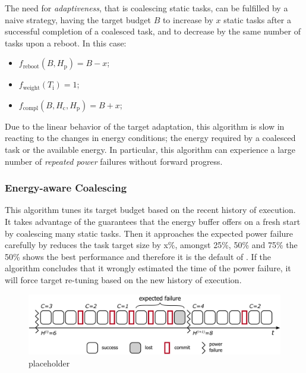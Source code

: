 The need for \emph{adaptiveness}, that is coalescing static tasks, can be fulfilled by a naive strategy, having the target budget $B$ to increase by $x$ static tasks after a successful completion of a coalesced task, and to decrease by the same number of tasks upon a reboot. In this case: 
\begin{itemize}
\item $f_\text{reboot}(B, H_\text{p}) = B - x $;
\item $f_\text{weight}(T_\text{i}) =  1$; 
\item $f_\text{compl}(B,H_\text{c},H_\text{p}) = B + x$; 
\end{itemize}
Due to the linear behavior of the target adaptation, this algorithm is slow in reacting to the changes in energy conditions; the energy required by a coalesced task or the available energy. In particular, this algorithm can experience a large number of \emph{repeated power} failures without forward progress. 

\subsubsection{Energy-aware Coalescing}
\label{subsec:ECoalescing}
This algorithm tunes its target budget based on the recent history of execution. It takes advantage of the guarantees that the energy buffer offers on a fresh start by coalescing many static tasks. Then it approaches the expected power failure carefully by reduces the task target size by x\%, amongst 25\%, 50\% and 75\% the 50\% shows the best performance and therefore it is the default of \sys. If the algorithm concludes that it wrongly estimated the time of the power failure, it will force target re-tuning based on the new history of execution. 


\begin{figure}
	\centering
	\includegraphics[width=0.5\columnwidth]{figures/energy-aware-coal.pdf}
	\caption{placeholder}
	\label{fig:energyAware}
\end{figure}
































